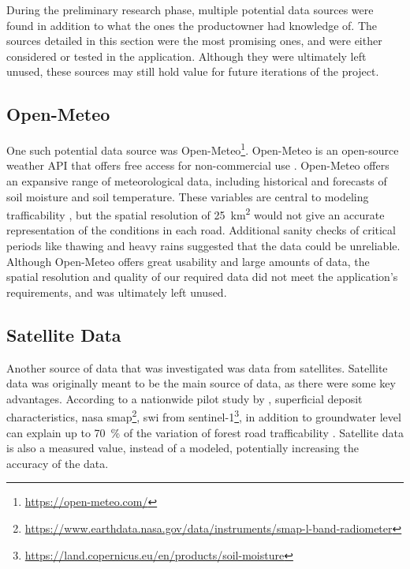 During the preliminary research phase, multiple potential data sources were found in addition to what the ones the \gls{productowner} had knowledge of. The sources detailed in this section were the most promising ones, and were either considered or tested in the application. Although they were ultimately left unused, these sources may still hold value for future iterations of the project.

\subsection{Open-Meteo}

One such potential data source was Open-Meteo\footnote{\url{https://open-meteo.com/}}. Open-Meteo is an open-source weather API that offers free access for non-commercial use \cite{openmeteo}. Open-Meteo offers an expansive range of meteorological data, including historical and forecasts of soil moisture and soil temperature. These variables are central to modeling trafficability \cite{fjeld2023trafficability}, but the spatial resolution of \qty{25}{\kilo\meter\squared} would not give an accurate representation of the conditions in each road. Additional sanity checks of critical periods like thawing and heavy rains suggested that the data could be unreliable. Although Open-Meteo offers great usability and large amounts of data, the spatial resolution and quality of our required data did not meet the application's requirements, and was ultimately left unused. 

\subsection{Satellite Data}

Another source of data that was investigated was data from satellites. Satellite data was originally meant to be the main source of data, as there were some key advantages. According to a nationwide pilot study by \textcite{fjeld2023trafficability}, superficial deposit characteristics,
\acrshort{nasa} \gls{smap}\footnote{\url{https://www.earthdata.nasa.gov/data/instruments/smap-l-band-radiometer}}, \acrfull{swi} from \gls{sentinel-1}\footnote{\url{https://land.copernicus.eu/en/products/soil-moisture}}, in addition to \gls{groundwater} level can explain up to \qty{70}{\percent} of the variation of forest road trafficability \cite{fjeld2023trafficability}. Satellite data is also a measured value, instead of a modeled, potentially increasing the accuracy of the data.

